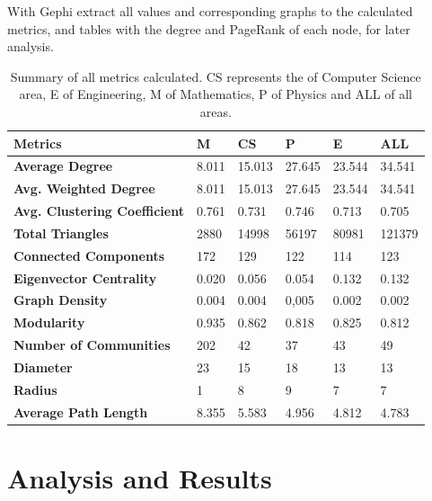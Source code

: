 \documentclass{article}
\begin{document}
\begin{multicols}{2}
With Gephi extract all values and corresponding graphs to the calculated metrics, and tables with the degree and PageRank of each node, for later analysis.



\begin{table}[hb]
\centering
\caption{Summary of all metrics calculated. CS represents the of Computer Science area, E of Engineering, M of Mathematics, P of Physics and ALL of all areas.}
\label{tab:table3}
\vspace{0.1cm}
\begin{tabular}{p{5cm}|p{1.7cm}p{1.7cm}p{1.7cm}p{1.7cm}p{1.7cm}}

\textbf{Metrics} & \textbf{M} & \textbf{CS} & \textbf{P} & \textbf{E} & \textbf{ALL}\\
\hline

\textbf{Average Degree} & 8.011 & 15.013 & 27.645 & 23.544 & 34.541 \\
\textbf{Avg. Weighted Degree} & 8.011 & 15.013 & 27.645 & 23.544 & 34.541 \\
\textbf{Avg. Clustering Coefficient} & 0.761 & 0.731 & 0.746 & 0.713 & 0.705 \\
\textbf{Total Triangles} & 2880 & 14998 & 56197 & 80981 & 121379 \\
\textbf{Connected Components} & 172 & 129 & 122 & 114 & 123 \\
\textbf{Eigenvector Centrality} & 0.020 & 0.056 & 0.054 & 0.132 & 0.132 \\
\textbf{Graph Density} & 0.004 & 0.004 & 0,005 & 0.002 & 0.002 \\
\textbf{Modularity} & 0.935 & 0.862 & 0.818 & 0.825 & 0.812 \\
\textbf{Number of Communities} & 202 & 42 & 37 & 43 & 49 \\
\textbf{Diameter} & 23 & 15 & 18 & 13 & 13 \\
\textbf{Radius} & 1 & 8 & 9 & 7 & 7 \\
\textbf{Average Path Length} & 8.355 & 5.583 & 4.956 & 4.812 & 4.783 \\

\end{tabular}
\end{table}


\section{Analysis and Results}
\label{section.results}


\end{multicols}
\end{document}
